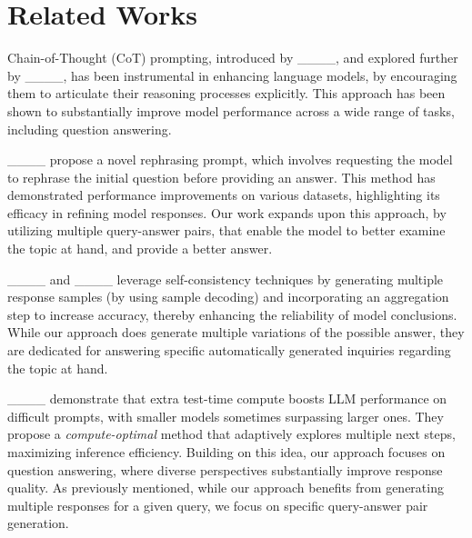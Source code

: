 \section{Related Works}
\label{sec:related-works}

Chain-of-Thought (CoT) prompting, introduced by ____, and explored further by ____, has been instrumental in enhancing language models, by encouraging them to articulate their reasoning processes explicitly. This approach has been shown to substantially improve model performance across a wide range of tasks, including question answering. 

____ propose a novel rephrasing prompt, which involves requesting the model to rephrase the initial question before providing an answer. This method has demonstrated performance improvements on various datasets, highlighting its efficacy in refining model responses. Our work expands upon this approach, by utilizing multiple query-answer pairs, that enable the model to better examine the topic at hand, and provide a better answer.

____ and ____ leverage self-consistency techniques by generating multiple response samples (by using sample decoding) and incorporating an aggregation step to increase accuracy, thereby enhancing the reliability of model conclusions. While our approach does generate multiple variations of the possible answer, they are dedicated for answering specific automatically generated inquiries regarding the topic at hand.

____ demonstrate that extra test-time compute boosts LLM performance on difficult prompts, with smaller models sometimes surpassing larger ones. They propose a \textit{compute-optimal} method that adaptively explores multiple next steps, maximizing inference efficiency. Building on this idea, our approach focuses on question answering, where diverse perspectives substantially improve response quality. As previously mentioned, while our approach benefits from generating multiple responses for a given query, we focus on specific query-answer pair generation.